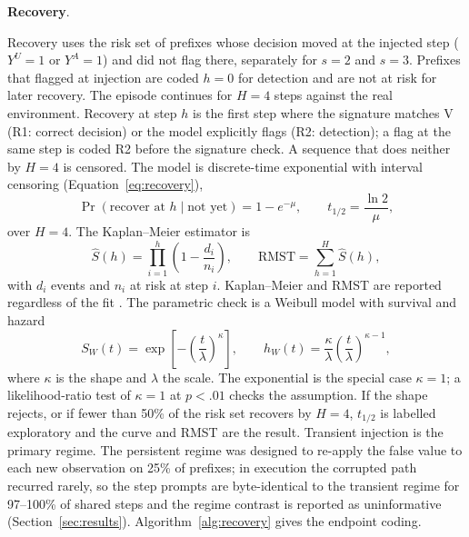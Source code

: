 \documentclass[a4paper,fleqn]{cas-sc}
\begin{document}
\noindent\textbf{Recovery}.\

Recovery uses the risk set of prefixes whose decision moved at the injected step ($Y^{U}=1$ or
$Y^{A}=1$) and did not flag there, separately for $s=2$ and $s=3$. Prefixes that flagged at
injection are coded $h=0$ for detection and are not at risk for later recovery. The episode
continues for $H=4$ steps against the real environment. Recovery at step $h$ is the first step
where the signature matches V (R1: correct decision) or the model explicitly flags (R2:
detection); a flag at the same step is coded R2 before the signature check. A sequence that does
neither by $H=4$ is censored. The model is discrete-time
exponential with interval censoring (Equation~\ref{eq:recovery}),
\begin{equation}
  \Pr(\text{recover at } h \mid \text{not yet}) = 1-e^{-\mu},
  \qquad
  t_{1/2} = \frac{\ln 2}{\mu},
  \label{eq:recovery}
\end{equation}
over $H=4$. The Kaplan--Meier estimator is
\begin{equation}
  \hat S(h) = \prod_{i=1}^{h}\left(1-\frac{d_i}{n_i}\right),\qquad
  \mathrm{RMST} = \sum_{h=1}^{H} \hat S(h),
  \label{eq:km}
\end{equation}
with $d_i$ events and $n_i$ at risk at step $i$. Kaplan--Meier and RMST are reported regardless
of the fit \cite{kaplan1958}. The parametric check is a Weibull model with survival and hazard
\begin{equation}
  S_{W}(t)=\exp\!\left[-\left(\frac{t}{\lambda}\right)^{\kappa}\right],
  \qquad
  h_{W}(t)=\frac{\kappa}{\lambda}\left(\frac{t}{\lambda}\right)^{\kappa-1},
  \label{eq:weibull}
\end{equation}
where $\kappa$ is the shape and $\lambda$ the scale. The exponential is the special case
$\kappa=1$; a likelihood-ratio test of $\kappa=1$ at $p<.01$ checks the assumption. If the shape
rejects, or if fewer than 50\% of the risk set recovers by $H=4$,
$t_{1/2}$ is labelled exploratory and the curve and RMST are the result. Transient injection is
the primary regime. The persistent regime was designed to re-apply the false value to each new
observation on 25\% of prefixes; in execution the corrupted path recurred rarely, so the step
prompts are byte-identical to the transient regime for 97--100\% of shared steps and the regime
contrast is reported as uninformative (Section~\ref{sec:results}). Algorithm~\ref{alg:recovery}
gives the endpoint coding.
\end{document}
